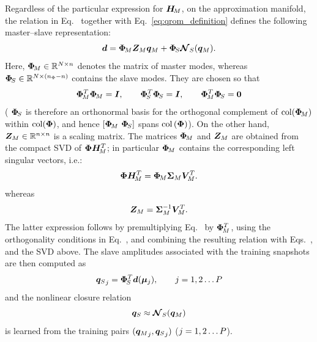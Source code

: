 \documentclass[preprint,10pt]{elsarticle}  %
\begin{document}
Regardless of the particular expression for $\bm{H}_{\!M}$, on the approximation manifold, the relation in Eq.~ together with Eq.~\ref{eq:qrom_definition} defines the following master--slave representation:
\begin{equation}
\label{eq:decoder_master_slave}
    \bm{d} =    \bm{\Phi}_{\!M} \bm{Z}_{M} \bm{q}_M
    +
    \bm{\Phi}_{\!S} \boldsymbol{\mathcal{N}}_{S}(\bm{q}_M).
\end{equation}
 Here, \(\bm{\Phi}_{\!M}\in\mathbb{R}^{N \times n}\) denotes the matrix of master
modes, whereas
\(\bm{\Phi}_{\!S}\in\mathbb{R}^{N \times (n_{\Phi}-n)}\) contains the slave modes. They are chosen so that
\begin{equation}
\label{eq:orto}
    \bm{\Phi}_{\!M}^T\bm{\Phi}_{\!M}=\bm{I},
    \qquad
    \bm{\Phi}_{\!S}^T\bm{\Phi}_{\!S}=\bm{I},
    \qquad
    \bm{\Phi}_{\!M}^T\bm{\Phi}_{\!S}=\boldsymbol{0}
\end{equation}
( \(\bm{\Phi}_{\!S}\) is  therefore an orthonormal basis for the
orthogonal complement of \(\operatorname{col}(\bm{\Phi}_{\!M})\) within \(\operatorname{col}(\bm{\Phi})\), and hence \([\bm{\Phi}_{\!M}\ \bm{\Phi}_{\!S}]\) spans \(\operatorname{col}{(\bm{\Phi})}\)). On the other hand, $\bm{Z}_{M} \in \mathbb{R}^{n \times n}$ is a scaling matrix. The matrices \(\bm{\Phi}_{\!M}\) and \(\bm{Z}_{M}\) are obtained from the compact SVD of $\bm{\Phi}\bm{H}_{\!M}^T$; in particular \(\bm{\Phi}_{\!M}\) contains the corresponding left singular
vectors, i.e.:
\begin{equation}
\label{eq:master_basis_svd}
    \bm{\Phi}\bm{H}_{\!M}^T
    =
    \bm{\Phi}_{\!M}\bm{\Sigma}_{M}\bm{V}_{M}^T.
\end{equation}
 whereas
\begin{equation}
\label{eq:Am_definition}
    \bm{Z}_{M}
    =
    \bm{\Sigma}_{M}^{-1}\bm{V}_{M}^T.
\end{equation}
The latter expression follows by premultiplying
Eq.~ by \(\bm{\Phi}_{\!M}^T\), using the
orthogonality conditions in Eq.~, and combining the
resulting relation with Eqs.~,
 and the SVD above.    The slave amplitudes associated with the training snapshots
are then computed as
\[
    {\bm{q}_{S}}_j=\bm{\Phi}_{\!S}^T\bm{d}(\bm{\mu}_j), \qquad j = 1,2 \ldots P
\]
and the nonlinear closure relation
\begin{equation}
\label{eq:closure}
     \bm{q}_{S}\approx\boldsymbol{\mathcal{N}}_{S}(\bm{q}_M)
\end{equation}
is learned from the training pairs $({\bm{q}_M}_j,{\bm{q}_{S}}_j)$  ($j=1,2 \ldots P$).
\end{document}
